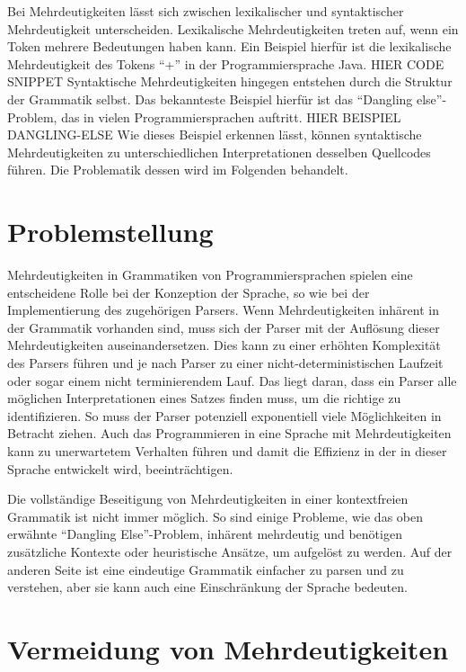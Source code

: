 \documentclass[runningheads]{llncs}
\begin{document}
Bei Mehrdeutigkeiten lässt sich zwischen lexikalischer und syntaktischer Mehrdeutigkeit unterscheiden.
Lexikalische Mehrdeutigkeiten treten auf, wenn ein Token mehrere Bedeutungen haben kann.
Ein Beispiel hierfür ist die lexikalische Mehrdeutigkeit des Tokens ``+'' in der Programmiersprache Java.
HIER CODE SNIPPET
Syntaktische Mehrdeutigkeiten hingegen entstehen durch die Struktur der Grammatik selbst.
Das bekannteste Beispiel hierfür ist das ``Dangling else''-Problem, das in vielen Programmiersprachen auftritt.
HIER BEISPIEL DANGLING-ELSE
Wie dieses Beispiel erkennen lässt,
können syntaktische Mehrdeutigkeiten zu unterschiedlichen Interpretationen desselben Quellcodes führen.
Die Problematik dessen wird im Folgenden behandelt.


\section{Problemstellung}

Mehrdeutigkeiten in Grammatiken von Programmiersprachen
spielen eine entscheidene Rolle bei der Konzeption der Sprache,
so wie bei der Implementierung des zugehörigen Parsers.
Wenn Mehrdeutigkeiten inhärent in der Grammatik vorhanden sind,
muss sich der Parser mit der Auflösung dieser Mehrdeutigkeiten auseinandersetzen.
Dies kann zu einer erhöhten Komplexität des Parsers führen
und je nach Parser zu einer nicht-deterministischen Laufzeit oder sogar einem nicht terminierendem Lauf.
Das liegt daran, dass ein Parser alle möglichen Interpretationen eines Satzes finden muss, um die richtige zu identifizieren.
So muss der Parser potenziell exponentiell viele Möglichkeiten in Betracht ziehen.
Auch das Programmieren in eine Sprache mit Mehrdeutigkeiten kann zu unerwartetem Verhalten führen
und damit die Effizienz in der in dieser Sprache entwickelt wird, beeinträchtigen.

Die vollständige Beseitigung von Mehrdeutigkeiten in einer kontextfreien Grammatik ist nicht immer möglich.
So sind einige Probleme, wie das oben erwähnte ``Dangling Else''-Problem,
inhärent mehrdeutig und benötigen zusätzliche Kontexte oder heuristische Ansätze, um aufgelöst zu werden.
Auf der anderen Seite ist eine eindeutige Grammatik einfacher zu parsen und zu verstehen,
aber sie kann auch eine Einschränkung der Sprache bedeuten.

\section{Vermeidung von Mehrdeutigkeiten}
\end{document}
